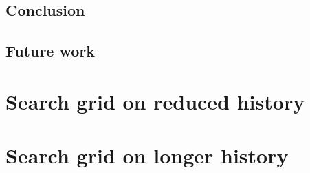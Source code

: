 \documentclass[11pt,a4paper,oneside]{book}
\begin{document}
\section{Conclusion}


\section{Future work}




\clearpage
\appendix
\chapter{Search grid on reduced history}\label{6mapp}










\chapter{Search grid on longer history}\label{10yapp}













\end{document}

